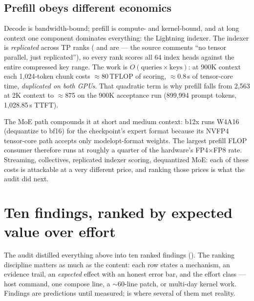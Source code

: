 \subsection{Prefill obeys different economics}

Decode is bandwidth-bound; prefill is compute- and kernel-bound, and at long
context one component dominates everything: the Lightning indexer. The indexer
is \emph{replicated} across TP ranks ( and  are
 --- the source comments ``no tensor parallel, just
replicated''), so every rank scores all 64 index heads against the entire
compressed key range. The work is $O(\text{queries} \times \text{keys})$: at
900K context each 1{,}024-token chunk costs $\approx$80\,TFLOP of scoring,
$\approx$0.8\,s of tensor-core time, \emph{duplicated on both GPUs}. That
quadratic term is why prefill falls from 2{,}563 \tokspersec{} at 2K context to
$\approx$875 \tokspersec{} on the 900K acceptance run (899{,}994 prompt tokens,
1{,}028.85\,s TTFT).

The MoE path compounds it at short and medium context:
b12x runs W4A16 (dequantize to bf16) for the checkpoint's
 expert format because its NVFP4 tensor-core path accepts
only modelopt-format weights. The largest prefill FLOP consumer therefore
runs at roughly a quarter of the hardware's FP4$\times$FP8 rate. Streaming,
collectives, replicated indexer scoring, dequantized MoE: each of these
costs is attackable at a very different price, and ranking those prices is
what the audit did next.

\section{Ten findings, ranked by expected value over effort}
\label{sec:perf-findings}

The audit distilled everything above into ten ranked findings
(). The ranking discipline matters as much as the
content: each row states a mechanism, an evidence trail, an \emph{expected}
effect with an honest error bar, and the effort class --- host command, one
compose line, a $\sim$60-line patch, or multi-day kernel work. Findings are
predictions until measured;  is where several of them met
reality.

